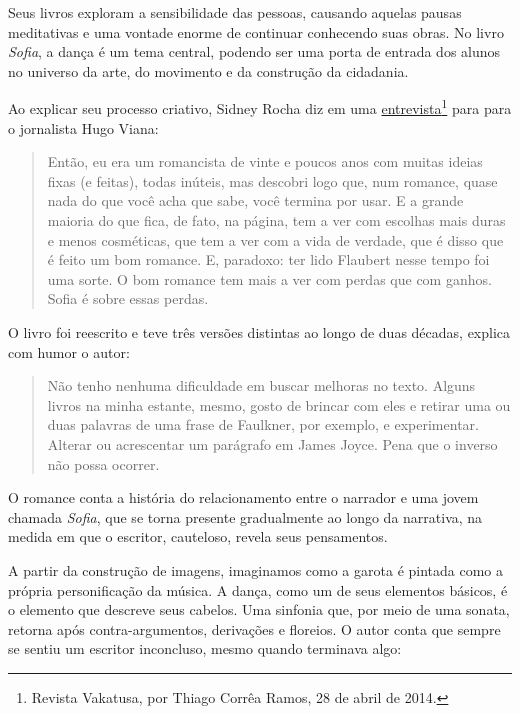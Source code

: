 \documentclass[12pt]{extarticle}
\begin{document}
Seus livros exploram a sensibilidade das pessoas, causando aquelas pausas
meditativas e uma vontade enorme de continuar conhecendo suas obras.  No livro
\textit{Sofia}, a dança é um tema central, podendo ser uma porta de entrada dos alunos
no universo da arte, do movimento e da construção da cidadania. 

Ao explicar seu processo criativo, Sidney Rocha diz em uma 
\href{http://www.vacatussa.com/entrevista-sidney-rocha/}{entrevista}\footnote{
  Revista Vakatusa, por Thiago Corrêa Ramos, 28 de abril de 2014.} para para 
o jornalista Hugo Viana:


\begin{quote}
Então, eu era um romancista de vinte e poucos anos com muitas ideias fixas (e feitas), todas inúteis, mas descobri logo que, num romance, quase nada do que você acha que sabe, você termina por usar. E a grande maioria do que fica, de fato, na página, tem a ver com escolhas mais duras e menos cosméticas, que tem a ver com a vida de verdade, que é disso que é feito um bom romance. E, paradoxo: ter lido Flaubert nesse tempo foi uma sorte. O bom romance tem mais a ver com perdas que com ganhos. Sofia é sobre essas perdas. 
\end{quote}

O livro foi reescrito e teve três versões distintas ao longo de duas décadas, explica com 
humor o autor:

\begin{quote}
 Não tenho nenhuma dificuldade em buscar melhoras no texto. Alguns livros na minha estante, mesmo, gosto de brincar com eles e retirar uma ou duas palavras de uma frase de Faulkner, por exemplo, e experimentar. Alterar ou acrescentar um parágrafo em James Joyce. Pena que o inverso não possa ocorrer.
\end{quote}


O romance conta a história do relacionamento entre o narrador e uma
jovem chamada \textit{Sofia}, que se torna
presente gradualmente ao longo da narrativa, na medida em que  
o escritor, cauteloso, revela seus pensamentos.  

A partir da construção de imagens, imaginamos como a garota é pintada como a própria personificação da música. A dança, como 
um de seus elementos básicos, é o elemento que descreve seus
cabelos. Uma sinfonia que, por meio de uma
sonata, retorna após contra-argumentos, derivações e floreios.  
O autor conta que sempre se sentiu um escritor inconcluso, mesmo quando terminava algo:
\end{document}
